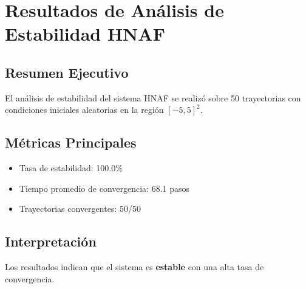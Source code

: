 \section{Resultados de Análisis de Estabilidad HNAF}

\subsection{Resumen Ejecutivo}
El análisis de estabilidad del sistema HNAF se realizó sobre 50 trayectorias con condiciones iniciales aleatorias en la región $[-5, 5]^2$.

\subsection{Métricas Principales}
\begin{itemize}
\item Tasa de estabilidad: 100.0\%
\item Tiempo promedio de convergencia: 68.1 pasos
\item Trayectorias convergentes: 50/50
\end{itemize}

\subsection{Interpretación}
Los resultados indican que el sistema es \textbf{estable} con una alta tasa de convergencia.
